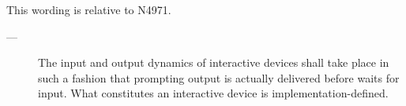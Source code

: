 \newpage
{}\label{api}

This wording is relative to N4971.\cite{Standard}




\begin{description}
    \item[---] The input and output dynamics of interactive devices shall take
               place in such a fashion that prompting output is actually
               delivered before  waits
               for input. What constitutes an interactive device is
               implementation-defined.
\end{description}


